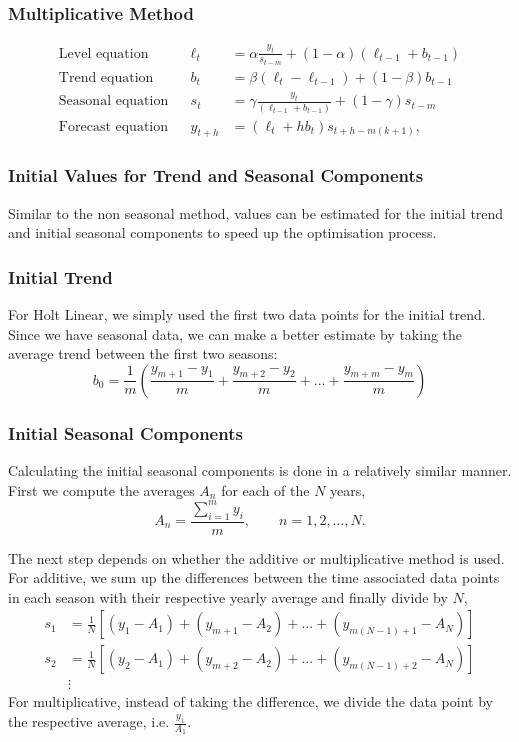 \documentclass{article}
\begin{document}
  \subsubsection{Multiplicative Method}
  \begin{align*}
    \text{Level equation}   &&\ell_{t} &= \alpha \frac{y_{t}}{s_{t-m}} + (1 - \alpha)(\ell_{t-1} + b_{t-1})\\
    \text{Trend equation}   &&b_{t} &= \beta(\ell_{t}-\ell_{t-1}) + (1 - \beta)b_{t-1}\\
    \text{Seasonal equation}   &&s_{t} &= \gamma \frac{y_{t}}{(\ell_{t-1} + b_{t-1})} + (1 - \gamma)s_{t-m}\\
    \text{Forecast equation}   &&\hat{y}_{t+h} &= (\ell_{t} + hb_{t})s_{t+h-m(k+1)},
  \end{align*}

  \subsubsection{Initial Values for Trend and Seasonal Components}
  Similar to the non seasonal method, values can be estimated for the initial trend and initial seasonal components to speed up the optimisation process.

  \subsubsection*{Initial Trend}
  For Holt Linear, we simply used the first two data points for the initial trend. Since we have seasonal data, we can make a better estimate by taking the average trend between the first two seasons:
  \begin{equation*}
    b_0 = \frac{1}{m}\left(\frac{y_{m+1}-y_1}{m} + \frac{y_{m+2}-y_2}{m} + ... + \frac{y_{m+m}-y_m}{m}\right)
  \end{equation*}

  \subsubsection*{Initial Seasonal Components}
  Calculating the initial seasonal components is done in a relatively similar manner. First we compute the averages $A_n$ for each of the $N$ years,
  \begin{equation*}
    A_n = \frac{\sum_{i=1}^m{y_i}}{m}, \qquad n=1,2,...,N.
  \end{equation*}

  The next step depends on whether the additive or multiplicative method is used. For additive, we sum up the differences between the time associated data points in each season with their respective yearly average and finally divide by $N$,
  \begin{align*}
    s_1 &= \frac{1}{N}\left[(y_1-A_1) + (y_{m+1}-A_2) + ... + (y_{m(N-1)+1}-A_N)\right]\\
    s_2 &= \frac{1}{N}\left[(y_2-A_1) +( y_{m+2}-A_2) + ... + (y_{m(N-1)+2}-A_N)\right]\\
    &\vdots
  \end{align*}
  For multiplicative, instead of taking the difference, we divide the data point by the respective average, i.e. $\frac{y_1}{A_1}$.
\end{document}
